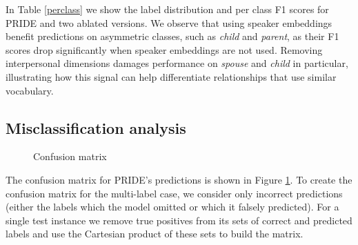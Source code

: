 In Table \ref{perclass} we show the label distribution and per class F1 scores for PRIDE and two ablated versions.
We observe that using speaker embeddings benefit predictions on asymmetric classes, such as \emph{child} and \emph{parent}, as their F1 scores drop significantly when speaker embeddings are not used. Removing interpersonal dimensions damages performance on \textit{spouse} and \textit{child} in particular, illustrating  how this signal can help differentiate relationships that use similar vocabulary.


\subsection{Misclassification analysis}

\begin{figure}[t!]
\centering
{}
\caption{Confusion matrix}
\label{confusion}
\end{figure}

The confusion matrix for PRIDE's predictions is shown in Figure \ref{confusion}. To create the confusion matrix for the multi-label case, we consider only incorrect predictions (either the labels which the model omitted or which it falsely predicted). For a single test instance we remove true positives from its sets of correct and predicted labels and use the Cartesian product of these sets to build the matrix.

